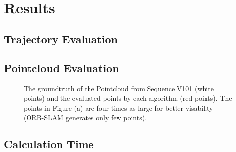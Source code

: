 \chapter{Results}

\section{Trajectory Evaluation}

\section{Pointcloud Evaluation}

	\begin{figure}%
    \centering
    \qquad
	\qquad
    \caption{The groundtruth of the Pointcloud from Sequence V101 (white points) and the evaluated points by each algorithm (red points). 
	The points in Figure (a) are four times as large for better visability (ORB-SLAM generates only few points). 
	}%
    \label{fig:example}%
	\end{figure}

\section{Calculation Time}

